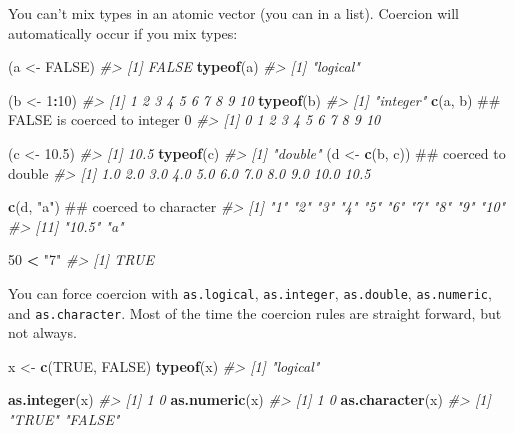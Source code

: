 \documentclass[]{book}
\newenvironment{Shaded}{\begin{snugshade}}{\end{snugshade}}
\newcommand{\CommentTok}[1]{\textcolor[rgb]{0.56,0.35,0.01}{\textit{#1}}}
\newcommand{\DecValTok}[1]{\textcolor[rgb]{0.00,0.00,0.81}{#1}}
\newcommand{\FloatTok}[1]{\textcolor[rgb]{0.00,0.00,0.81}{#1}}
\newcommand{\KeywordTok}[1]{\textcolor[rgb]{0.13,0.29,0.53}{\textbf{#1}}}
\newcommand{\NormalTok}[1]{#1}
\newcommand{\OperatorTok}[1]{\textcolor[rgb]{0.81,0.36,0.00}{\textbf{#1}}}
\newcommand{\OtherTok}[1]{\textcolor[rgb]{0.56,0.35,0.01}{#1}}
\newcommand{\StringTok}[1]{\textcolor[rgb]{0.31,0.60,0.02}{#1}}
\theoremstyle{definition}
\theoremstyle{definition}
\theoremstyle{definition}
\theoremstyle{remark}
\begin{document}
You can't mix types in an atomic vector (you can in a list). Coercion
will automatically occur if you mix types:

\begin{Shaded}
\begin{Highlighting}[]
\NormalTok{(a <-}\StringTok{ }\OtherTok{FALSE}\NormalTok{)}
\CommentTok{#> [1] FALSE}
\KeywordTok{typeof}\NormalTok{(a)}
\CommentTok{#> [1] "logical"}

\NormalTok{(b <-}\StringTok{ }\DecValTok{1}\OperatorTok{:}\DecValTok{10}\NormalTok{)}
\CommentTok{#>  [1]  1  2  3  4  5  6  7  8  9 10}
\KeywordTok{typeof}\NormalTok{(b)}
\CommentTok{#> [1] "integer"}
\KeywordTok{c}\NormalTok{(a, b)         ## FALSE is coerced to integer 0}
\CommentTok{#>  [1]  0  1  2  3  4  5  6  7  8  9 10}

\NormalTok{(c <-}\StringTok{ }\FloatTok{10.5}\NormalTok{)}
\CommentTok{#> [1] 10.5}
\KeywordTok{typeof}\NormalTok{(c)}
\CommentTok{#> [1] "double"}
\NormalTok{(d <-}\StringTok{ }\KeywordTok{c}\NormalTok{(b, c))  ## coerced to double}
\CommentTok{#>  [1]  1.0  2.0  3.0  4.0  5.0  6.0  7.0  8.0  9.0 10.0 10.5}

\KeywordTok{c}\NormalTok{(d, }\StringTok{"a"}\NormalTok{)       ## coerced to character}
\CommentTok{#>  [1] "1"    "2"    "3"    "4"    "5"    "6"    "7"    "8"    "9"    "10"  }
\CommentTok{#> [11] "10.5" "a"}

\DecValTok{50} \OperatorTok{<}\StringTok{ "7"}
\CommentTok{#> [1] TRUE}
\end{Highlighting}
\end{Shaded}

You can force coercion with \texttt{as.logical}, \texttt{as.integer},
\texttt{as.double}, \texttt{as.numeric}, and \texttt{as.character}. Most
of the time the coercion rules are straight forward, but not always.

\begin{Shaded}
\begin{Highlighting}[]
\NormalTok{x <-}\StringTok{ }\KeywordTok{c}\NormalTok{(}\OtherTok{TRUE}\NormalTok{, }\OtherTok{FALSE}\NormalTok{)}
\KeywordTok{typeof}\NormalTok{(x)}
\CommentTok{#> [1] "logical"}

\KeywordTok{as.integer}\NormalTok{(x)}
\CommentTok{#> [1] 1 0}
\KeywordTok{as.numeric}\NormalTok{(x)}
\CommentTok{#> [1] 1 0}
\KeywordTok{as.character}\NormalTok{(x)}
\CommentTok{#> [1] "TRUE"  "FALSE"}
\end{Highlighting}
\end{Shaded}
\end{document}
